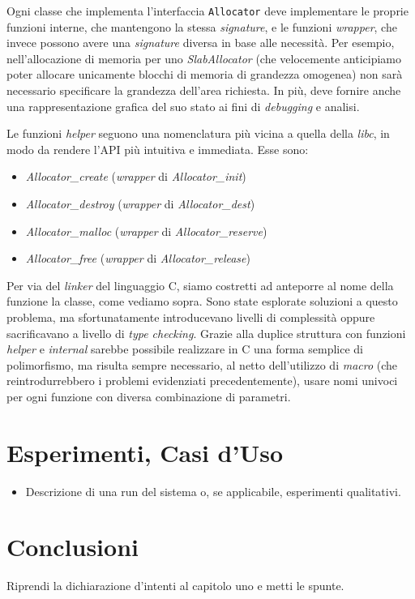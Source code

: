 \documentclass[noexaminfo]{sapthesis}
\begin{document}
Ogni classe che implementa l’interfaccia \texttt{Allocator} deve implementare le proprie funzioni interne, che mantengono la stessa \textit{signature}, e le funzioni \textit{wrapper}, che invece possono avere una \textit{signature} diversa in base alle necessità. Per esempio, nell’allocazione di memoria per uno \textit{SlabAllocator} (che velocemente anticipiamo poter allocare unicamente blocchi di memoria di grandezza omogenea) non sarà necessario specificare la grandezza dell’area richiesta. In più, deve fornire anche una rappresentazione grafica del suo stato ai fini di \textit{debugging} e analisi.

Le funzioni \textit{helper} seguono una nomenclatura più vicina a quella della \textit{libc}, in modo da rendere l’API più intuitiva e immediata. Esse sono:
\begin{itemize}
  \item \textit{Allocator\_create} (\textit{wrapper} di \textit{Allocator\_init})
  \item \textit{Allocator\_destroy} (\textit{wrapper} di \textit{Allocator\_dest})
  \item \textit{Allocator\_malloc} (\textit{wrapper} di \textit{Allocator\_reserve})
  \item \textit{Allocator\_free} (\textit{wrapper} di \textit{Allocator\_release})
\end{itemize}

Per via del \textit{linker} del linguaggio C, siamo costretti ad anteporre al nome della funzione la classe, come vediamo sopra. Sono state esplorate soluzioni a questo problema, ma sfortunatamente introducevano livelli di complessità oppure sacrificavano a livello di \textit{type checking}. Grazie alla duplice struttura con funzioni \textit{helper} e \textit{internal} sarebbe possibile realizzare in C una forma semplice di polimorfismo, ma risulta sempre necessario, al netto dell’utilizzo di \textit{macro} (che reintrodurrebbero i problemi evidenziati precedentemente), usare nomi univoci per ogni funzione con diversa combinazione di parametri.

\chapter{Esperimenti, Casi d’Uso}

\begin{itemize}
  \item Descrizione di una run del sistema o, se applicabile, esperimenti qualitativi.
\end{itemize}

\chapter{Conclusioni}

Riprendi la dichiarazione d’intenti al capitolo uno e metti le spunte.

\backmatter
\cleardoublepage
\end{document}
